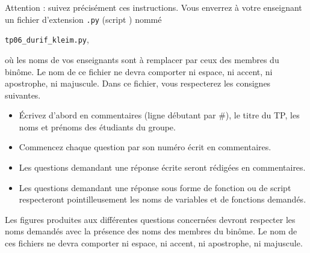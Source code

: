 Attention : suivez précisément ces instructions. Vous enverrez à votre enseignant un fichier d'extension  \texttt{.py} (script \python) nommé
\begin{center}
  \texttt{tp06\_durif\_kleim.py},
\end{center}
 où les noms de vos enseignants sont à remplacer par ceux des membres du binôme. Le nom de ce 
fichier ne devra comporter ni espace, ni accent, ni apostrophe, ni majuscule.
Dans ce fichier, vous respecterez les consignes suivantes.
\begin{itemize}
  \item \'Ecrivez d'abord en commentaires (ligne débutant par \#), le titre du TP, les noms et prénoms des étudiants du groupe.
  \item Commencez chaque question par son numéro écrit en commentaires.
  \item Les questions demandant une réponse écrite seront rédigées en commentaires.
  \item Les questions demandant une réponse sous forme de fonction ou de script respecteront pointilleusement les noms de variables et de fonctions demandés.
\end{itemize}


Les figures produites aux différentes questions concernées devront respecter les noms demandés avec la présence des noms des membres du binôme. Le nom de ces fichiers ne devra comporter ni espace, ni accent, ni apostrophe, ni majuscule. 